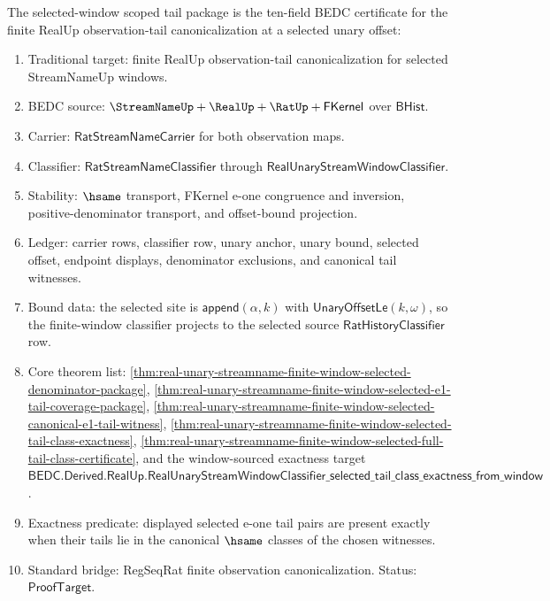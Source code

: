 \begin{definition}
\label{def:real-unary-streamname-selected-window-scoped-tail-package}
The selected-window scoped tail package is the ten-field BEDC certificate for
the finite RealUp observation-tail canonicalization at a selected unary offset:
\begin{enumerate}
\item Traditional target: finite RealUp observation-tail canonicalization for
selected StreamNameUp windows.
\item BEDC source: $\StreamNameUp+\RealUp+\RatUp+\mathsf{FKernel}$ over
$\mathsf{BHist}$.
\item Carrier: $\mathsf{RatStreamNameCarrier}$ for both observation maps.
\item Classifier:
$\mathsf{RatStreamNameClassifier}$ through
$\mathsf{RealUnaryStreamWindowClassifier}$.
\item Stability: $\hsame$ transport, FKernel e-one congruence and inversion,
positive-denominator transport, and offset-bound projection.
\item Ledger: carrier rows, classifier row, unary anchor, unary bound, selected
offset, endpoint displays, denominator exclusions, and canonical tail witnesses.
\item Bound data: the selected site is $\mathsf{append}(\alpha,k)$ with
$\mathsf{UnaryOffsetLe}(k,\omega)$, so the finite-window classifier projects to
the selected source $\mathsf{RatHistoryClassifier}$ row.
\item Core theorem list:
\autoref{thm:real-unary-streamname-finite-window-selected-denominator-package},
\autoref{thm:real-unary-streamname-finite-window-selected-e1-tail-coverage-package},
\autoref{thm:real-unary-streamname-finite-window-selected-canonical-e1-tail-witness},
\autoref{thm:real-unary-streamname-finite-window-selected-tail-class-exactness},
\autoref{thm:real-unary-streamname-finite-window-selected-full-tail-class-certificate},
and the window-sourced exactness target
$\mathsf{BEDC.Derived.RealUp.RealUnaryStreamWindowClassifier\_selected\_tail\_class\_exactness\_from\_window}$.
\item Exactness predicate: displayed selected e-one tail pairs are present
exactly when their tails lie in the canonical $\hsame$ classes of the chosen
witnesses.
\item Standard bridge: RegSeqRat finite observation canonicalization. Status:
$\mathsf{ProofTarget}$.
\end{enumerate}
\end{definition}

